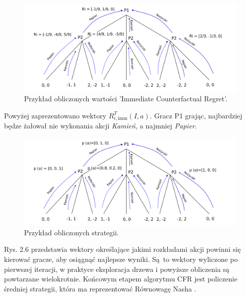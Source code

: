 \documentclass[12pt,oneside,a4paper]{report}
\begin{document}
\begin{figure}[th!]
            \center
           \includegraphics[width=1\textwidth]{./img/drawing3.pdf}
           \caption{Przykład obliczonych wartości 'Immediate Counterfactual Regret'.}
\end{figure}

\vspace{0.5cm}
\vspace{10cm}

Powyżej zaprezentowano wektory $R^{T}_{i,\text{imm}} (I, a)$.
Gracz P1 grając, najbardziej będze żałował nie wykonania akcji \emph{Kamień}, a najmniej
\emph{Papier}.

\vspace{0.5cm}
\begin{figure}[th!]
            \center
           \includegraphics[width=1\textwidth]{./img/drawing4.pdf}
           \caption{Przykład obliczonych strategii.}
\end{figure}
 
Rys. 2.6 przedstawia wektory określające jakimi rozkładami akcji powinni się kierować gracze, aby
osiągnąć najlepsze wyniki. Są to wektory wyliczone po pierwszej iteracji, w praktyce eksploracja
drzewa i powyższe obliczenia są powtarzane wielokrotnie. Końcowym etapem algorytmu CFR jest
policzenie średniej strategii, która ma reprezentować Równowagę Nasha \cite{CFR}.
\end{document}
